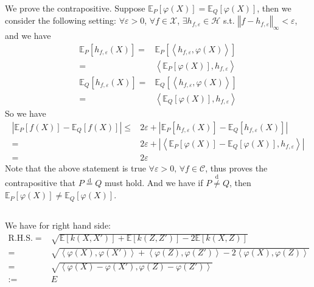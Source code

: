 \documentclass[11pt,a4paper]{ctexart}
\numberwithin{equation}{section}%
\begin{document}
We prove the contrapositive. Suppose $ \mathbb{E}_P\left[ \varphi (X) \right] = \mathbb{E}_Q\left[ \varphi(X) \right] $, then we consider the following setting: $ \forall \varepsilon >0 $, $ \forall f\in \mathcal{X} $, $ \exists h_{f,\varepsilon }\in \mathcal{H} $ s.t. $ \left\Vert f-h_{f,\varepsilon } \right\Vert _\infty <\varepsilon  $, and we have
\begin{align*}
    \mathbb{E}_P\left[ h_{f,\varepsilon }(X) \right]=& \mathbb{E}_P\left[ \left\langle h_{f,\varepsilon }, \varphi (X) \right\rangle   \right]\\
    =& \left\langle \mathbb{E}_P\left[ \varphi (X) \right] ,h_{f,\varepsilon }\right\rangle \\
    \mathbb{E}_Q\left[ h_{f,\varepsilon }(X) \right]=& \mathbb{E}_Q\left[ \left\langle h_{f,\varepsilon }, \varphi (X) \right\rangle   \right]\\
    =& \left\langle \mathbb{E}_Q\left[ \varphi (X) \right] ,h_{f,\varepsilon }\right\rangle
\end{align*}
So we have
\begin{align*}
    \left\vert \mathbb{E}_P\left[ f(X) \right] - \mathbb{E}_Q\left[ f(X) \right]   \right\vert \leq & 2\varepsilon + \left\vert \mathbb{E}_P\left[ h_{f,\varepsilon }(X) \right] - \mathbb{E}_Q\left[ h_{f,\varepsilon }(X) \right]   \right\vert \\
    =& 2\varepsilon + \left\vert \left\langle \mathbb{E}_P\left[ \varphi (X) \right] - \mathbb{E}_Q\left[ \varphi (X) \right] ,h_{f,\varepsilon } \right\rangle  \right\vert \\
    =& 2\varepsilon 
\end{align*}
Note that the above statement is true $ \forall \varepsilon >0,\, \forall f\in \mathcal{C} $, thus proves the contrapositive that $ P\mathop{ = }\limits^{\mathrm{ d } } Q $ must hold. And we have if $ P\mathop{ \neq }\limits^{\mathrm{ d } } Q $, then $ \mathbb{E}_P\left[ \varphi (X) \right] \neq \mathbb{E}_Q\left[ \varphi (X) \right] $.


\subsection{}

We have for right hand side:
\begin{align*}
     \mathrm{R.H.S.}=&\sqrt{\mathbb{E}\left[ k(X,X') \right] + \mathbb{E}\left[ k(Z,Z') \right]  -2\mathbb{E}\left[ k(X,Z) \right] }\\
     =& \sqrt{ \left\langle \varphi (X), \varphi (X') \right\rangle + \left\langle \varphi (Z), \varphi (Z') \right\rangle -2\left\langle \varphi (X), \varphi (Z) \right\rangle }\\
     =& \sqrt{\left\langle \varphi (X)-\varphi (X') , \varphi (Z)-\varphi (Z') \right\rangle } \\
    :=& E
\end{align*}
\end{document}
